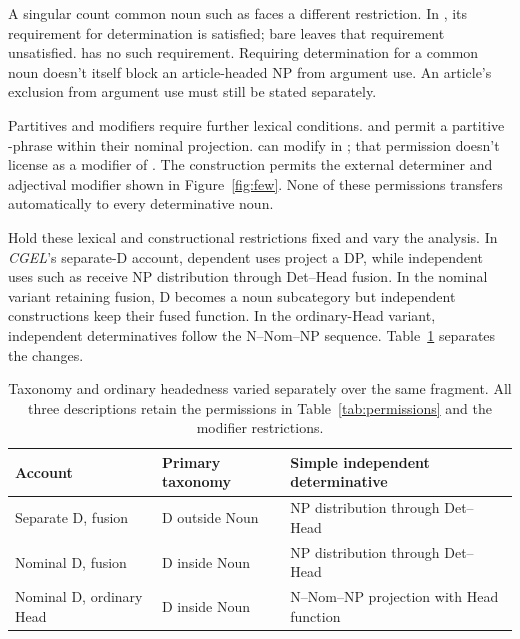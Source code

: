 \documentclass[12pt]{article}
\begin{document}
A singular count common noun such as  faces a different restriction. In , its requirement for determination is satisfied; bare  leaves that requirement unsatisfied.  has no such requirement. Requiring determination for a common noun doesn't itself block an article-headed NP from argument use. An article's exclusion from argument use must still be stated separately.

Partitives and modifiers require further lexical conditions.  and  permit a partitive -phrase within their nominal projection.  can modify  in ; that permission doesn't license  as a modifier of . The construction  permits the external determiner and adjectival modifier shown in Figure~\ref{fig:few}. None of these permissions transfers automatically to every determinative noun.

Hold these lexical and constructional restrictions fixed and vary the analysis. In \textit{CGEL}'s separate-D account, dependent uses project a DP, while independent uses such as  receive NP distribution through Det--Head fusion. In the nominal variant retaining fusion, D becomes a noun subcategory but independent constructions keep their fused function. In the ordinary-Head variant, independent determinatives follow the N--Nom--NP sequence. Table~\ref{tab:economy} separates the changes.

\begin{table}[tb]
\centering\small
\caption{Taxonomy and ordinary headedness varied separately over the same fragment. All three descriptions retain the permissions in Table~\ref{tab:permissions} and the modifier restrictions.}\label{tab:economy}
\begin{tabular}{>{\raggedright\arraybackslash}p{3.1cm}>{\raggedright\arraybackslash}p{3.9cm}>{\raggedright\arraybackslash}p{4.7cm}}
\toprule
Account & Primary taxonomy & Simple independent determinative \\
\midrule
Separate D, fusion & D outside Noun & NP distribution through Det--Head \\
Nominal D, fusion & D inside Noun & NP distribution through Det--Head \\
Nominal D, ordinary Head & D inside Noun & N--Nom--NP projection with Head function \\
\bottomrule
\end{tabular}
\end{table}
\end{document}

